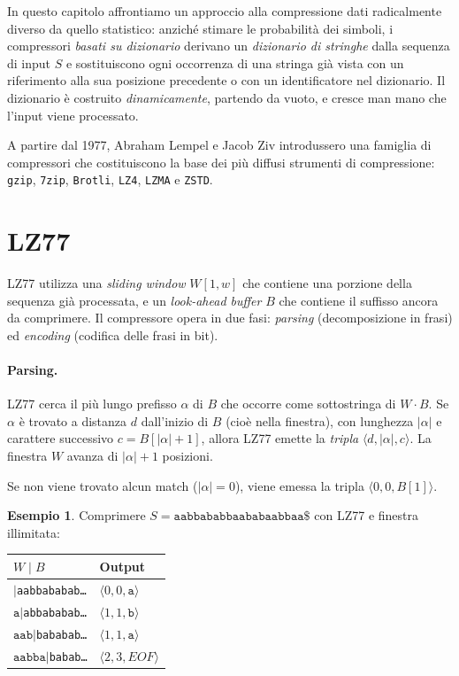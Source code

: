 \documentclass[12pt, a4paper, oneside]{book}
\theoremstyle{plain}
\theoremstyle{definition}
\newtheorem{esempio}[teorema]{Esempio}
\theoremstyle{remark}
\begin{document}
In questo capitolo affrontiamo un approccio alla compressione dati radicalmente diverso da quello statistico: anziché stimare le probabilità dei simboli, i compressori \emph{basati su dizionario} derivano un \emph{dizionario di stringhe} dalla sequenza di input $S$ e sostituiscono ogni occorrenza di una stringa già vista con un riferimento alla sua posizione precedente o con un identificatore nel dizionario. Il dizionario è costruito \emph{dinamicamente}, partendo da vuoto, e cresce man mano che l'input viene processato.

A partire dal 1977, Abraham Lempel e Jacob Ziv introdussero una famiglia di compressori che costituiscono la base dei più diffusi strumenti di compressione: \texttt{gzip}, \texttt{7zip}, \texttt{Brotli}, \texttt{LZ4}, \texttt{LZMA} e \texttt{ZSTD}.

\section{LZ77}
\label{sec:lz77}

LZ77 utilizza una \emph{sliding window} $W[1,w]$ che contiene una porzione della sequenza già processata, e un \emph{look-ahead buffer} $B$ che contiene il suffisso ancora da comprimere. Il compressore opera in due fasi: \emph{parsing} (decomposizione in frasi) ed \emph{encoding} (codifica delle frasi in bit).

\paragraph{Parsing.}
LZ77 cerca il più lungo prefisso $\alpha$ di $B$ che occorre come sottostringa di $W \cdot B$. Se $\alpha$ è trovato a distanza $d$ dall'inizio di $B$ (cioè nella finestra), con lunghezza $|\alpha|$ e carattere successivo $c = B[|\alpha| + 1]$, allora LZ77 emette la \emph{tripla} $\langle d, |\alpha|, c \rangle$. La finestra $W$ avanza di $|\alpha| + 1$ posizioni.

Se non viene trovato alcun match ($|\alpha| = 0$), viene emessa la tripla $\langle 0, 0, B[1] \rangle$.

\begin{esempio}
Comprimere $S = \texttt{aabbababbaababaabbaa\$}$ con LZ77 e finestra illimitata:

\medskip
\begin{tabular}{ll}
$W \mid B$ & Output \\
\hline
$\texttt{|}$\texttt{aabbababab\ldots} & $\langle 0, 0, \texttt{a}\rangle$ \\
$\texttt{a|}$\texttt{abbababab\ldots} & $\langle 1, 1, \texttt{b}\rangle$ \\
$\texttt{aab|}$\texttt{bababab\ldots} & $\langle 1, 1, \texttt{a}\rangle$ \\
$\texttt{aabba|}$\texttt{babab\ldots} & $\langle 2, 3, \mathit{EOF}\rangle$ \\
\end{tabular}
\end{esempio}
\end{document}
